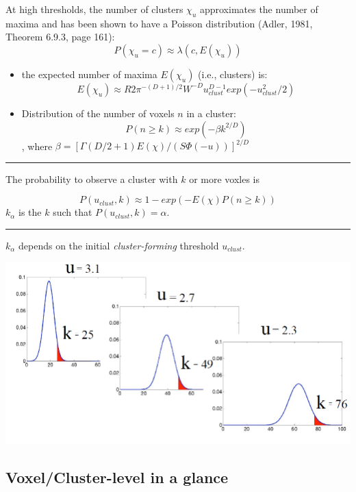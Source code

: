 \documentclass[]{article}
\begin{document}
At high thresholds, the number of clusters \(\chi_u\) approximates the
number of maxima and has been shown to have a Poisson distribution
(Adler, 1981, Theorem 6.9.3, page 161):
\[ P(\chi_u = c) \approx \lambda(c, E(\chi_u))\]

\begin{itemize}
\item
  the expected number of maxima \(E(\chi_u)\) (i.e., clusters) is:
  \[E(\chi_u)\approx R 2\pi^{-(D+1)/2}W^{-D} u_{clust}^{D-1} exp(-u_{clust}^2/2)\]
\item
  Distribution of the number of voxels \(n\) in a cluster:\\
  \[P(n \geq k) \approx exp (-\beta k^{2/D})\], where
  \(\beta = [\Gamma(D/2 + 1)E(\chi)/(S \Phi(-u))]^{2/D}\)
\end{itemize}

\begin{center}\rule{0.5\linewidth}{\linethickness}\end{center}

The probability to observe a cluster with \(k\) or more voxles is

\[P(u_{clust}, k) \approx 1 - exp (-E(\chi)P(n \geq k))\] \(k_\alpha\)
is the \(k\) such that \(P(u_{clust}, k)=\alpha\).

\begin{center}\rule{0.5\linewidth}{\linethickness}\end{center}

\(k_\alpha\) depends on the initial \emph{cluster-forming} threshold
\(u_{clust}\).

\begin{center}\includegraphics[width=700px]{./figs/RFT_Threshold_function} \end{center}

\subsection{Voxel/Cluster-level in a
glance}\label{voxelcluster-level-in-a-glance}
\end{document}
